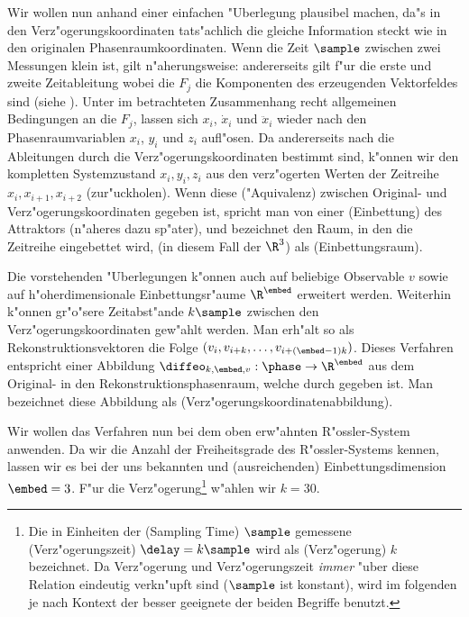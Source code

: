 Wir wollen nun anhand einer einfachen "Uberlegung 
plausibel machen, da"s in den Ver\-z"ogerungskoordinaten
tats"achlich die gleiche Information steckt wie in den originalen Phasenraumkoordinaten.
Wenn die Zeit $\sample$ zwischen zwei Messungen klein ist, gilt n"aherungsweise:
andererseits gilt f"ur die erste und zweite Zeitableitung
wobei die $F_j$ die Komponenten des erzeugenden Vektorfeldes sind (siehe ).
Unter im betrachteten Zusammenhang recht allgemeinen Bedingungen an die $F_j$,
lassen sich $x_i$, $\dot x_i$ und $\ddot x_i$ wieder nach den Phasenraumvariablen $x_i$,
$y_i$ und $z_i$ aufl"osen.  Da andererseits nach  die Ableitungen durch die
Verz"ogerungskoordinaten bestimmt sind, k"onnen wir den kompletten Systemzustand
$x_i,y_i,z_i$ aus den verz"ogerten Werten der Zeitreihe $x_{i},x_{i+1},x_{i+2}$
\metapher(zur"uckholen). Wenn diese \naja("Aquivalenz) zwischen Original- und
Verz"ogerungskoordinaten gegeben ist, spricht man von einer \begriff(Einbettung) des
Attraktors (n"aheres dazu sp"ater), und bezeichnet den Raum, in den die Zeitreihe
eingebettet wird, (in diesem Fall der $\R^3$) als \begriff(Einbettungsraum).


Die vorstehenden "Uberlegungen k"onnen auch auf beliebige Observable $v$ sowie auf h"oherdimensionale
Einbettungsr"aume $\R^\embed$ erweitert werden. Weiterhin k"onnen gr"o"sere
Zeit\-ab\-st"ande $k\sample$ zwischen den Verz"ogerungskoordinaten gew"ahlt werden.  Man
erh"alt so als Rekonstruktionsvektoren die Folge $(v_{i},
v_{i+k},\dots,v_{i+(\embed-1)k})$. Dieses Verfahren entspricht einer
Abbildung $\diffeo_{k,\embed,v}:\phase\to\R^\embed$ aus dem Original- in den
Rekonstruktionsphasenraum, welche durch
gegeben ist. Man bezeichnet diese Abbildung  als \begriff(Verz"ogerungskoordinatenabbildung).

Wir wollen das Verfahren nun bei dem oben erw"ahnten R"ossler-System anwenden.  Da wir die
Anzahl der Freiheitsgrade des R"ossler-Systems kennen, lassen wir es bei der uns bekannten
und \naja(ausreichenden) Einbettungsdimension $\embed=3$. F"ur die Verz"ogerung\footnote{
  Die in Einheiten der \begriff(Sampling Time) $\sample$ gemessene
  \begriff(Verz"ogerungszeit) $\delay=k\sample$ wird als \begriff(Verz"ogerung) $k$
  bezeichnet. Da Verz"ogerung und Verz"ogerungszeit {\em immer} "uber diese Relation
  eindeutig verkn"upft sind ($\sample$ ist konstant), wird im folgenden je nach Kontext
  der besser geeignete der beiden Begriffe benutzt.} w"ahlen wir $k=30$.

